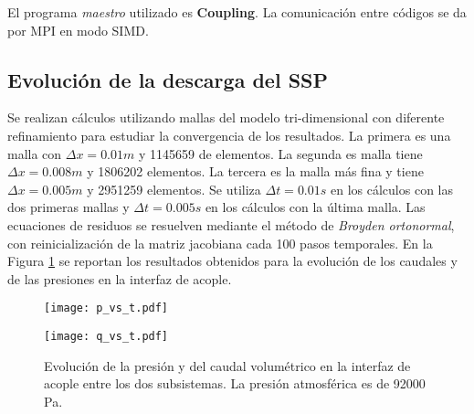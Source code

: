 El programa \textit{maestro} utilizado es \textbf{Coupling}.
La comunicación entre códigos se da por MPI en modo SIMD.

\subsection*{Evolución de la descarga del SSP}

Se realizan cálculos utilizando mallas del modelo tri-dimensional con diferente refinamiento para estudiar la convergencia de los resultados.
La primera es una malla con $\Delta x=0.01m$ y 1145659 de elementos. 
La segunda es malla tiene $\Delta x=0.008m$ y 1806202 elementos.
La tercera es la malla más fina y tiene $\Delta x=0.005m$ y 2951259 elementos.
Se utiliza $\Delta t=0.01s$ en los cálculos con las dos primeras mallas y $\Delta t=0.005s$ en los cálculos con la última malla.
Las ecuaciones de residuos se resuelven
mediante el método de \textit{Broyden ortonormal},
con reinicialización de la matriz jacobiana cada 100 pasos temporales.
En la Figura \ref{qpvst} se reportan los resultados obtenidos para la evolución de los caudales y de las presiones en la interfaz de acople.

\begin{figure}[ht]
	\begin{minipage}{0.5\linewidth}
		\centering
		\texttt{[image: p\_vs\_t.pdf]}
		\label{asd}	
	\end{minipage}
	\begin{minipage}{0.5\linewidth}
		\centering
		\texttt{[image: q\_vs\_t.pdf]}
		\label{asd}	
	\end{minipage}
	\caption[Evolución de la presión y del caudal volumétrico en la interfaz de acople]
  {Evolución de la presión y del caudal volumétrico en la interfaz de acople entre los dos subsistemas.
  La presión atmosférica es de 92000 Pa.}  
	\label{qpvst}
\end{figure}


